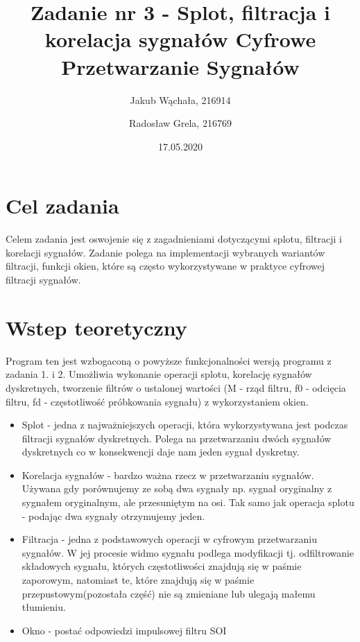 \documentclass[12pt]{article}
\title{{\bf Zadanie nr 3 - Splot, filtracja i korelacja sygnałów}\linebreak
Cyfrowe Przetwarzanie Sygnałów}
\author{Jakub Wąchała, 216914 \and Radosław Grela, 216769}
\date{17.05.2020}
\begin{document}
\clearpage\maketitle
\thispagestyle{empty}
\newpage
\setcounter{page}{1}
\section{Cel zadania}
\label{cel}
Celem zadania jest oswojenie się z zagadnieniami dotyczącymi splotu, filtracji i korelacji sygnałów. Zadanie polega na implementacji wybranych wariantów filtracji, funkcji okien, które są często wykorzystywane w praktyce cyfrowej filtracji sygnałów. \cite{bib1}

\section{Wstep teoretyczny}
Program ten jest wzbogaconą o powyższe funkcjonalności wersją programu z zadania 1. i 2. Umożliwia wykonanie operacji splotu, korelację sygnałów dyskretnych, tworzenie filtrów o ustalonej wartości (M - rząd filtru, f0 - odcięcia filtru, fd - częstotliwość próbkowania sygnału) z wykorzystaniem okien. 
\begin{itemize}
\item Splot - jedna z najważniejszych operacji, która wykorzystywana jest podczas filtracji sygnałów dyskretnych. Polega na przetwarzaniu dwóch sygnałów dyskretnych co w konsekwencji daje nam jeden sygnał dyskretny.
\item Korelacja sygnałów - bardzo ważna rzecz w przetwarzaniu sygnałów. Używana gdy porównujemy ze sobą dwa sygnały np. sygnał oryginalny z sygnałem oryginalnym, ale przesuniętym na osi. Tak samo jak operacja splotu - podając dwa sygnały otrzymujemy jeden.
\item Filtracja - jedna z podstawowych operacji w cyfrowym przetwarzaniu sygnałów. W jej procesie widmo sygnału podlega modyfikacji tj. odfiltrowanie składowych sygnału, których częstotliwości znajdują się w paśmie zaporowym, natomiast te, które znajdują się w paśmie przepustowym(pozostała część) nie są zmieniane lub ulegają małemu tłumieniu.
\item Okno - postać odpowiedzi impulsowej filtru SOI
\end{itemize}
\end{document}
